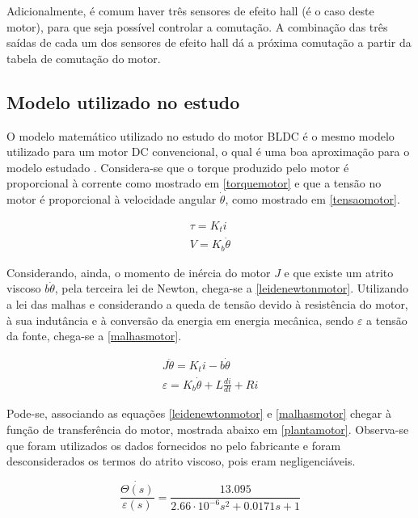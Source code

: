 \documentclass[a4paper,11pt]{article}
\begin{document}
		
		Adicionalmente, é comum haver três sensores de efeito hall (é o caso deste motor), para que seja possível controlar a comutação. A combinação das três saídas de cada um dos sensores de efeito hall dá a próxima comutação a partir da tabela de comutação do motor.
		
		\subsection{Modelo utilizado no estudo}
		
		O modelo matemático utilizado no estudo do motor BLDC é o mesmo modelo utilizado para um motor DC convencional, o qual é uma boa aproximação para o modelo estudado \cite{modelomotor}. Considera-se que o torque produzido pelo motor é proporcional à corrente como mostrado em \ref{torquemotor} e que a tensão no motor é proporcional à velocidade angular $\dot{\theta}$, como mostrado em \ref{tensaomotor}.
		
		\begin{align}
			\tau = K_ti \label{torquemotor}\\
			V = K_b\dot{\theta} \label{tensaomotor}
		\end{align}
		
		Considerando, ainda, o momento de inércia do motor $J$ e que existe um atrito viscoso $b\dot{\theta}$, pela terceira lei de Newton, chega-se a \ref{leidenewtonmotor}. Utilizando a lei das malhas e considerando a queda de tensão devido à resistência do motor, à sua indutância e à conversão da energia em energia mecânica, sendo $\varepsilon$ a tensão da fonte, chega-se a \ref{malhasmotor}.
		
		\begin{align}
			J\ddot{\theta} = K_ti - b\dot{\theta} \label{leidenewtonmotor}\\
			\varepsilon = K_b\dot{\theta} + L\frac{di}{dt} + Ri \label{malhasmotor}
		\end{align}
		
		Pode-se, associando as equações \ref{leidenewtonmotor} e \ref{malhasmotor} chegar à função de transferência do motor, mostrada abaixo em \ref{plantamotor}. Observa-se que foram utilizados os dados fornecidos no pelo fabricante e foram desconsiderados os termos do atrito viscoso, pois eram negligenciáveis.
		
		\begin{equation}
			\frac{\dot{\Theta(s)}}{\varepsilon(s)} = \frac{13.095}{2.66 \cdot 10^{-6} s^2+0.0171s+1} \label{plantamotor}
		\end{equation}
		
\end{document}
